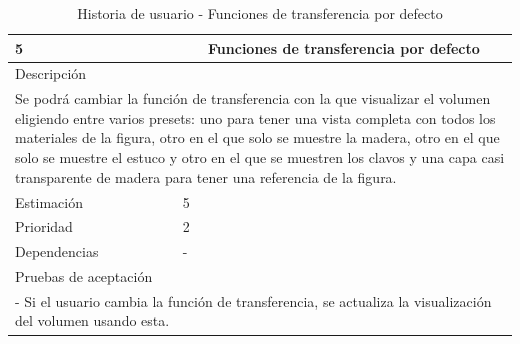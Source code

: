 \begin{table}[H]
	\begin{center}
		\begin{tabular} {|l|c|l|}
			\hline
			5 & \multicolumn{2}{c|}{Funciones de transferencia por defecto} \\ \hline \hline
			\multicolumn{3}{|l|}{Descripción} \\ \hline
			\multicolumn{3}{|p{12cm}|}{Se podrá cambiar la función de transferencia con la que visualizar el volumen eligiendo entre varios presets: uno para tener una vista completa con todos los materiales de la figura, otro en el que solo se muestre la madera, otro en el que solo se muestre el estuco y otro en el que se muestren los clavos y una capa casi transparente de madera para tener una referencia de la figura.} \\ \hline
			\multicolumn{2}{|l|}{Estimación} & 5 \\ \hline
			\multicolumn{2}{|l|}{Prioridad} & 2 \\ \hline
			\multicolumn{2}{|l|}{Dependencias} & - \\ \hline
			\multicolumn{3}{|l|}{Pruebas de aceptación} \\ \hline
			\multicolumn{3}{|p{12cm}|}{ - Si el usuario cambia la función de transferencia, se actualiza la visualización del volumen usando esta.} \\ \hline
		\end{tabular}
	\end{center}
	\caption{Historia de usuario - Funciones de transferencia por defecto}
	\label{tab:hu_funciones_de_transferencia_por_defecto}
\end{table}

